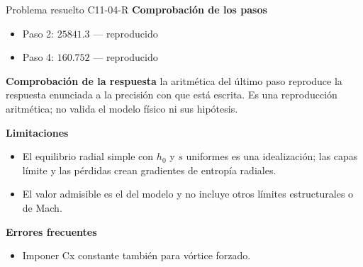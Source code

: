 \documentclass[10pt,openany]{book}
\begin{document}
\begin{studiumworked}{Problema resuelto C11-04-R}
\noindent\textbf{Comprobación de los pasos}
\begin{itemize}
\item Paso 2: $25841.3$ — reproducido
\item Paso 4: $160.752$ — reproducido
\end{itemize}

\noindent\textbf{Comprobación de la respuesta} la aritmética del último paso reproduce la respuesta enunciada a la precisión con que está escrita. Es una reproducción aritmética; no valida el modelo físico ni sus hipótesis.

\noindent\textbf{Limitaciones}
\begin{itemize}
\item El equilibrio radial simple con $h_0$ y $s$ uniformes es una idealización; las capas límite y las pérdidas crean gradientes de entropía radiales.
\item El valor admisible es el del modelo y no incluye otros límites estructurales o de Mach.
\end{itemize}

\noindent\textbf{Errores frecuentes}
\begin{itemize}
\item Imponer Cx constante también para vórtice forzado.
\end{itemize}
\end{studiumworked}
\end{document}
